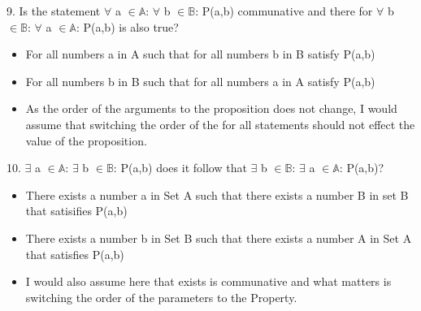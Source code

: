 \documentclass{article}
\begin{document}
  9. Is the statement \(\forall\) a \(\in \mathbb{A}\): \(\forall\) b \(\in \mathbb{B}\): P(a,b) communative and there for \(\forall\) b \(\in \mathbb{B}\): \(\forall\) a \(\in \mathbb{A}\): P(a,b) is also true? 
  \newline
  \begin{itemize}
    \item For all numbers a in A such that for all numbers b in B satisfy P(a,b)
    \item For all numbers b in B such that for all numbers a in A satisfy P(a,b)
    \item As the order of the arguments to the proposition does not change, I would assume that switching the order of the for all statements should not effect the value of the proposition.
  \end{itemize}
  10. \(\exists\) a \(\in \mathbb{A}\): \(\exists\) b \(\in \mathbb{B}\): P(a,b) does it follow that \(\exists\) b \(\in \mathbb{B}\): \(\exists\) a \(\in \mathbb{A}\): P(a,b)? 
  \begin{itemize}
    \item There exists a number a in Set A such that there exists a number B in set B that satisifies P(a,b)
    \item There exists a number b in Set B such that there exists a number A in Set A that satisfies P(a,b)
    \item I would also assume here that exists is communative and what matters is switching the order of the parameters to the Property.
  \end{itemize}
\end{document}
